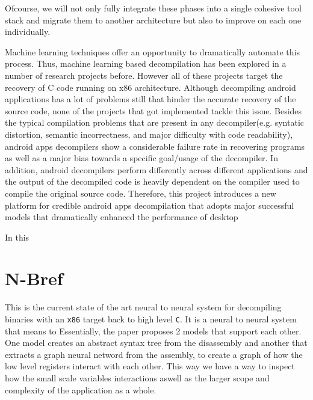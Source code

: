\documentclass{article}
\begin{document}
\noindent Ofcourse, we will not only fully integrate these phases into a single cohesive tool stack and migrate them to another architecture but also to improve on each one individually.

\noindent Machine learning techniques offer an opportunity to dramatically automate this process. Thus, machine learning based decompilation has been explored in a number of research projects before. 
However all of these projects target the recovery of C code running on x86 architecture. Although decompiling android applications has a lot of problems still that hinder the accurate recovery of the source code, none of the projects that got implemented tackle this issue.
Besides the typical compilation problems that are present in any decompiler(e.g. syntatic distortion, semantic incorrectness, and major difficulty with code readability), android apps decompilers show a considerable failure rate in recovering programs as well as a major bias towards a specific goal/usage of the decompiler. In addition, android decompilers perform differently across different applications and the output of the decompiled code is heavily dependent on the compiler used to compile the original source code.
Therefore, this project introduces a new platform for credible android apps decompilation that adopts major successful models that dramatically enhanced the performance of desktop  

In this 

\section{N-Bref}

This is the current state of the art neural to neural system for decompiling binaries with an \verb|x86| target back to high level \verb|C|.
It is a neural to neural system that means to 
Essentially, the paper proposes 2 models that support each other.
One model creates an abstract syntax tree from the disassembly and another that extracts a graph neural netword from the assembly, to create a graph of how the low level registers interact with each other.
This way we have a way to inspect how the small scale variables interactions aswell as the larger scope and complexity of the application as a whole.
\end{document}
